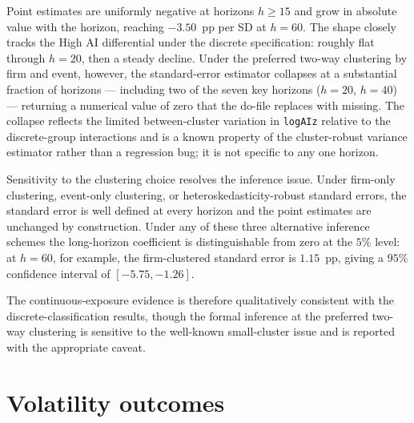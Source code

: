 Point estimates are uniformly negative at horizons $h \geq 15$ and
grow in absolute value with the horizon, reaching $-3.50$~pp per SD
at $h = 60$. The shape closely tracks the High AI differential under
the discrete specification: roughly flat through $h = 20$, then a
steady decline. Under the preferred two-way clustering by firm and
event, however, the standard-error estimator collapses at a
substantial fraction of horizons --- including two of the seven key
horizons ($h = 20$, $h = 40$) --- returning a numerical value of
zero that the do-file replaces with missing. The collapse reflects
the limited between-cluster variation in \texttt{logAIz} relative to
the discrete-group interactions and is a known property of the
cluster-robust variance estimator rather than a regression bug; it
is not specific to any one horizon.

Sensitivity to the clustering choice resolves the inference issue.
Under firm-only clustering, event-only clustering, or
heteroskedasticity-robust standard errors, the standard error is
well defined at every horizon and the point estimates are unchanged
by construction. Under any of these three alternative inference
schemes the long-horizon coefficient is distinguishable from zero at
the $5\%$ level: at $h = 60$, for example, the firm-clustered
standard error is $1.15$~pp, giving a $95\%$ confidence interval of
$[-5.75, -1.26]$.

\begin{table}[htbp]
\centering\small
\caption[Continuous \texttt{logAIz}: VCE sensitivity]{Continuous
\texttt{logAIz}: VCE sensitivity at key horizons}
\label{tab:logaiz_vce_sensitivity}

\end{table}

The continuous-exposure evidence is therefore qualitatively
consistent with the discrete-classification results, though the
formal inference at the preferred two-way clustering is sensitive to
the well-known small-cluster issue and is reported with the
appropriate caveat.

\section{Volatility outcomes}
\label{app:rob-volatility}

